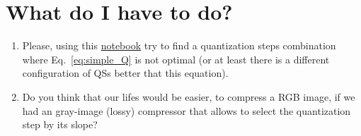 \begin{comment}
Thus, the optimal QSs should
operate in the curves with the same RD slope,
\begin{equation}
  \lambda_{\text{R}} = \lambda_{\text{G}} = \lambda_{\text{B}},
  \label{eq:optimal_quantization}
\end{equation}
for a given total bit-rate $R$, which implies that the contribution of
each component (the ratio between quality and bit-rate) to the quality
of $\tilde{x}$ has been highest
possible~\cite{vetterli1995wavelets,sayood2017introduction}.

Unfortunately, the previous procedure implies the computation of the
RD curve for each component, which is a time-consuming operation. For
this reason, and supposing that the statistics of each component are
similar and therefore, each component is going to generate a RD curve
with the same slopes for the same QSs, we can suppose that
Eq.~\ref{eq:simple_Q} satisfies Eq.~\ref{eq:optimal_quantization}.
\end{comment}

\section{What do I have to do?}
\begin{enumerate}
\item Please, using this
  \href{https://github.com/Sistemas-Multimedia/Sistemas-Multimedia.github.io/blob/master/milestones/05-RGB_compression/RGB_compression.ipynb}{notebook}
  try to find a quantization steps combination where
  Eq.~\ref{eq:simple_Q} is not optimal (or at least there is a
  different configuration of QSs better that this equation).
\item Do you think that our lifes would be easier, to compress a RGB
  image, if we had an gray-image (lossy) compressor that allows to
  select the quantization step by its slope?
\end{enumerate}

